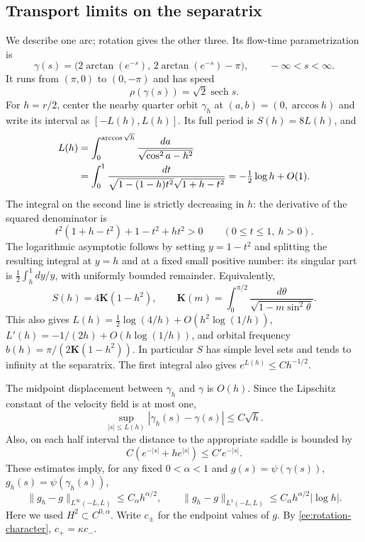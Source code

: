 \documentclass[reqno,11pt]{amsart}
\numberwithin{equation}{section}
\theoremstyle{remark}
\begin{document}
\subsection{Transport limits on the separatrix}

We describe one arc; rotation gives the other three. Its flow-time
parametrization is
\begin{equation}\label{ee:arc}
 \gamma(s)=\bigl(2\arctan(e^{-s}),\,
                    2\arctan(e^{-s})-\pi\bigr),
 \qquad -\infty<s<\infty.
\end{equation}
It runs from $(\pi,0)$ to $(0,-\pi)$ and has speed
\begin{equation}\label{ee:arc-speed}
 \rho(\gamma(s))=\sqrt2\operatorname{sech}s.
\end{equation}
For $h=r/2$, center the nearby quarter orbit $\gamma_h$ at
$(a,b)=(0,\arccos h)$ and write its interval as $[-L(h),L(h)]$.
Its full period is $S(h)=8L(h)$, and
\begin{align}\label{ee:period}
 L(h)&=\int_0^{\arccos\sqrt h}
                     \frac{da}{\sqrt{\cos^2a-h^2}}\notag\\
 &=\int_0^1\frac{dt}
 {\sqrt{1-(1-h)t^2}\sqrt{1+h-t^2}}
   =-\tfrac12\log h+O(1).
\end{align}
The integral on the second line is strictly decreasing in $h$:
the derivative of the squared denominator is
\[
 t^2(1+h-t^2)+1-t^2+ht^2>0\qquad(0\le t\le1,\ h>0).
\]
The logarithmic asymptotic follows by setting $y=1-t^2$ and
splitting the resulting integral at $y=h$ and at a fixed small
positive number: its singular part is
$\frac12\int_h^1dy/y$, with uniformly bounded remainder.
Equivalently,
\[
 S(h)=4\mathbf K(1-h^2),\qquad
 \mathbf K(m)=\int_0^{\pi/2}\frac{d\theta}{\sqrt{1-m\sin^2\theta}}.
\]
This also gives $L(h)=\tfrac12\log(4/h)+O(h^2\log(1/h))$,
$L'(h)=-1/(2h)+O(h\log(1/h))$, and orbital frequency
$b(h)=\pi/(2\mathbf K(1-h^2))$.
In particular $S$ has simple level sets and tends to infinity at
the separatrix. The first integral also gives
$e^{L(h)}\le C h^{-1/2}$.

The midpoint displacement between $\gamma_h$ and $\gamma$ is
$O(h)$. Since the Lipschitz constant of the velocity field is at
most one,
\begin{equation}\label{ee:orbit-comparison}
 \sup_{|s|\le L(h)}|\gamma_h(s)-\gamma(s)|\le C\sqrt h.
\end{equation}
Also, on each half interval the distance to the appropriate saddle
is bounded by
\[
 C(e^{-|s|}+he^{|s|})\le C'e^{-|s|}.
\]
These estimates imply, for any fixed $0<\alpha<1$ and
$g(s)=\psi(\gamma(s))$, $g_h(s)=\psi(\gamma_h(s))$,
\begin{equation}\label{ee:forcing-comparison}
 \|g_h-g\|_{L^\infty(-L,L)}\le C_\alpha h^{\alpha/2},
 \qquad
 \|g_h-g\|_{L^1(-L,L)}\le
                      C_\alpha h^{\alpha/2}|\log h|.
\end{equation}
Here we used $H^2\subset C^{0,\alpha}$. Write $c_\pm$ for the
endpoint values of $g$. By \eqref{ee:rotation-character},
$c_+=\kappa c_-$.
\end{document}
